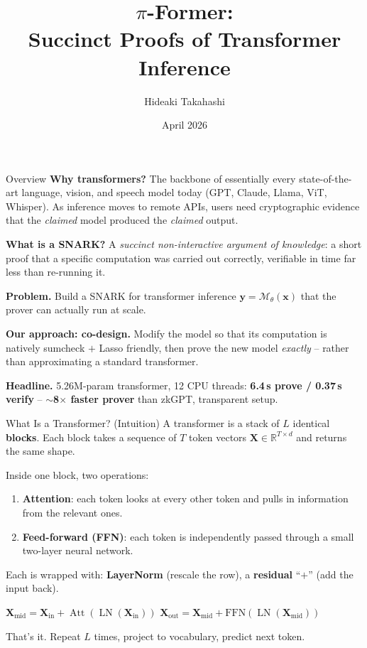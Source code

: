 \documentclass[10pt]{beamer}
\title[$\pi$-Former]{$\pi$-Former:\\ Succinct Proofs of Transformer Inference}
\author[H. Takahashi]{Hideaki Takahashi}
\date[]{April 2026}
\newcommand{\RR}{\mathbb{R}}
\newcommand{\bX}{\mathbf{X}}
\newcommand{\bx}{\mathbf{x}}
\newcommand{\by}{\mathbf{y}}
\DeclareMathOperator{\LN}{LN}
\DeclareMathOperator{\Att}{Att}
\begin{document}
\Front

\pagestyle{empty}

\begin{frame}{Overview}
\textbf{Why transformers?} The backbone of essentially every
state-of-the-art language, vision, and speech model today
(GPT, Claude, Llama, ViT, Whisper). As inference moves to remote
APIs, users need cryptographic evidence that the \emph{claimed}
model produced the \emph{claimed} output.

\medskip
\textbf{What is a SNARK?} A \emph{succinct non-interactive argument
of knowledge}: a short proof that a specific computation was carried
out correctly, verifiable in time far less than re-running it.

\medskip
\textbf{Problem.} Build a SNARK for transformer inference
$\by = \mathcal{M}_\theta(\bx)$ that the prover can actually run at
scale.

\medskip
\textbf{Our approach: co-design.} Modify the model so that its
computation is natively sumcheck $+$ Lasso friendly, then prove the
new model \emph{exactly} -- rather than approximating a standard
transformer.

\medskip
\textbf{Headline.} 5.26M-param transformer, 12 CPU threads:
\textbf{6.4\,s prove / 0.37\,s verify} --
$\sim$\textbf{8$\times$ faster prover} than zkGPT, transparent setup.
\end{frame}

\begin{frame}{What Is a Transformer? (Intuition)}
A transformer is a stack of $L$ identical \textbf{blocks}.
Each block takes a sequence of $T$ token vectors
$\bX\in\RR^{T\times d}$ and returns the same shape.

\medskip
Inside one block, two operations:
\begin{enumerate}
  \item \textbf{Attention}: each token looks at every other token
        and pulls in information from the relevant ones.
  \item \textbf{Feed-forward (FFN)}: each token is independently
        passed through a small two-layer neural network.
\end{enumerate}

\medskip
Each is wrapped with: \textbf{LayerNorm} (rescale the row),
a \textbf{residual} ``$+$'' (add the input back).

\medskip
\begin{center}
\small
$\bX_{\mathrm{mid}} = \bX_{\mathrm{in}} + \Att(\LN(\bX_{\mathrm{in}}))$
\hspace{1em}
$\bX_{\mathrm{out}} = \bX_{\mathrm{mid}} + \mathrm{FFN}(\LN(\bX_{\mathrm{mid}}))$
\end{center}

\medskip
That's it. Repeat $L$ times, project to vocabulary, predict next token.
\end{frame}
\end{document}
